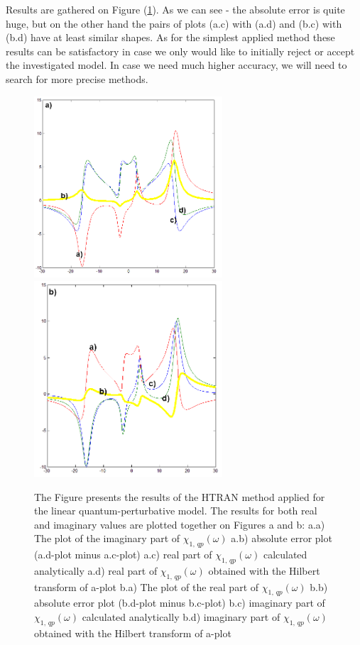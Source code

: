 \documentclass[12pt,twoside,a4paper]{article}
\numberwithin{equation}{subsection}
\numberwithin{figure}{subsection}
\begin{document}
Results are gathered on Figure (\ref{fig:htran_qp_2d}). As we can see - the absolute error is quite huge, but on the other hand the pairs of plots (a.c) with (a.d) and (b.c) with (b.d) have at least similar shapes. As for the simplest applied method these results can be satisfactory in case we only would like to initially reject or accept the investigated model. In case we need much higher accuracy, we will need to search for more precise methods.


\begin{figure} 
  \includegraphics[width=70mm]{img/htran_qp_2da.png} 
  \includegraphics[width=70mm]{img/htran_qp_2db.png}  
  \caption{The Figure presents the results of the HTRAN method applied for the linear quantum-perturbative model. The results for both real and imaginary values are plotted together on Figures a and b:
  a.a) The plot of the imaginary part of ${\chi_{1, \, qp}}(\omega )$ 
  a.b) absolute error plot (a.d-plot minus a.c-plot) 
  a.c) real part of ${\chi_{1, \, qp}}(\omega )$ calculated analytically
  a.d) real part of ${\chi_{1, \, qp}}(\omega )$ obtained with the Hilbert transform of a-plot
  b.a) The plot of the real part of ${\chi_{1, \, qp}}(\omega )$
  b.b) absolute error plot (b.d-plot minus b.c-plot)  
  b.c) imaginary part of ${\chi_{1, \, qp}}(\omega )$ calculated analytically 
  b.d) imaginary part of ${\chi_{1, \, qp}}(\omega )$ obtained with the Hilbert transform of a-plot 
  \label{fig:htran_qp_2d}}
\end{figure}
\end{document}
